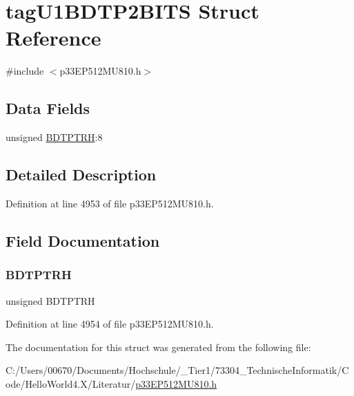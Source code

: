 \hypertarget{structtag_u1_b_d_t_p2_b_i_t_s}{}\section{tag\+U1\+B\+D\+T\+P2\+B\+I\+TS Struct Reference}
\label{structtag_u1_b_d_t_p2_b_i_t_s}


{\ttfamily \#include $<$p33\+E\+P512\+M\+U810.\+h$>$}

\subsection*{Data Fields}
\begin{DoxyCompactItemize}
\item 
unsigned \hyperlink{structtag_u1_b_d_t_p2_b_i_t_s_a8b721fa7e4b0f44c688bad296e599bf0}{B\+D\+T\+P\+T\+RH}\+:8
\end{DoxyCompactItemize}


\subsection{Detailed Description}


Definition at line 4953 of file p33\+E\+P512\+M\+U810.\+h.



\subsection{Field Documentation}
\mbox{\label{structtag_u1_b_d_t_p2_b_i_t_s_a8b721fa7e4b0f44c688bad296e599bf0}} 
\subsubsection{\texorpdfstring{B\+D\+T\+P\+T\+RH}{BDTPTRH}}
{\footnotesize\ttfamily unsigned B\+D\+T\+P\+T\+RH}



Definition at line 4954 of file p33\+E\+P512\+M\+U810.\+h.



The documentation for this struct was generated from the following file\+:\begin{DoxyCompactItemize}
\item 
C\+:/\+Users/00670/\+Documents/\+Hochschule/\+\_\+\+Tier1/73304\+\_\+\+Technische\+Informatik/\+Code/\+Hello\+World4.\+X/\+Literatur/\hyperlink{p33_e_p512_m_u810_8h}{p33\+E\+P512\+M\+U810.\+h}\end{DoxyCompactItemize}
